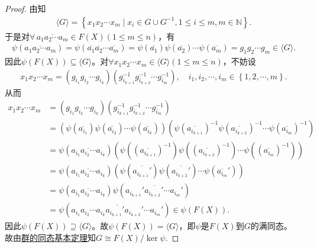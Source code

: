 \documentclass[../../main.tex]{subfiles}%
\begin{document}
\begin{proof}

由知
\begin{align*}
\langle G\rangle =\left\{ x_1x_2\cdots x_m\mid x_i\in G\cup G^{-1},1\leqslant i\leqslant m,m\in \mathbb{N} \right\}.
\end{align*}
于是对$\forall \,\overline{a_1a_2\cdots a_m}\in F\left( X \right) \left( 1\leqslant m\leqslant n \right)$，有
\begin{align*}
\psi \left( \overline{a_1a_2\cdots a_m} \right) =\psi \left( \overline{a_1}\overline{a_2}\cdots \overline{a_m} \right) =\psi \left( \overline{a_1} \right) \psi \left( \overline{a_2} \right) \cdots \psi \left( \overline{a_m} \right) =g_1g_2\cdots g_m\in \langle G\rangle.
\end{align*}
因此$\psi \left( F\left( X \right) \right) \subseteq \langle G\rangle$。对$\forall x_1x_2\cdots x_m\in \langle G\rangle \left( 1\leqslant m\leqslant n \right)$，不妨设
\begin{align*}
x_1x_2\cdots x_m=\left( g_{i_1}g_{i_2}\cdots g_{i_k} \right) \left( g_{i_{k+1}}^{-1}g_{i_{k+2}}^{-1}\cdots g_{i_m}^{-1} \right),\quad i_1,i_2,\cdots ,i_m\in \left\{ 1,2,\cdots ,m \right\}.
\end{align*}
从而
\begin{align*}
x_1x_2\cdots x_m&=\left( g_{i_1}g_{i_2}\cdots g_{i_k} \right) \left( g_{i_{k+1}}^{-1}g_{i_{k+2}}^{-1}\cdots g_{i_m}^{-1} \right) \\
&=\left( \psi \left( \overline{a_{i_1}} \right) \psi \left( \overline{a_{i_2}} \right) \cdots \psi \left( \overline{a_{i_k}} \right) \right) \left( \psi \left( \overline{a_{i_{k+1}}} \right) ^{-1}\psi \left( \overline{a_{i_{k+2}}} \right) ^{-1}\cdots \psi \left( \overline{a_{i_m}} \right) ^{-1} \right) \\
&=\psi \left( \overline{a_{i_1}a_{i_2}\cdots a_{i_k}} \right) \left( \psi \left( \left( \overline{a_{i_{k+1}}} \right) ^{-1} \right) \psi \left( \left( \overline{a_{i_{k+2}}} \right) ^{-1} \right) \cdots \psi \left( \left( \overline{a_{i_m}} \right) ^{-1} \right) \right) \\
&=\psi \left( \overline{a_{i_1}a_{i_2}\cdots a_{i_k}} \right) \left( \psi \left( \overline{a_{i_{k+1}}'} \right) \psi \left( \overline{a_{i_{k+2}}'} \right) \cdots \psi \left( \overline{a_{i_m}}' \right) \right) \\
&=\psi \left( \overline{a_{i_1}a_{i_2}\cdots a_{i_k}} \right) \psi \left( \overline{a_{i_{k+1}}'a_{i_{k+2}}'\cdots a_{i_m}'} \right) \\
&=\psi \left( \overline{a_{i_1}a_{i_2}\cdots a_{i_k}a_{i_{k+1}}'a_{i_{k+2}}'\cdots a_{i_m}'} \right) \in \psi \left( F\left( X \right) \right).
\end{align*}
因此$\psi \left( F\left( X \right) \right) \supseteq \langle G\rangle$。故$\psi \left( F\left( X \right) \right) =\langle G\rangle$，即$\psi$是$F\left( X \right)$到$G$的满同态。
故由\hyperref[theorem:群的同态基本定理]{群的同态基本定理}知$G\cong F(X)/\ker\psi$.

\end{proof}
\end{document}
